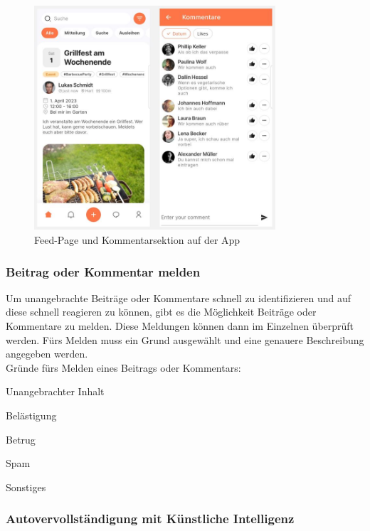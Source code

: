 \begin{figure}[H]
  \centering
  \includegraphics[width=0.8\textwidth]{pics/feed-and-comment-section.JPG}
  \caption{Feed-Page und Kommentarsektion auf der App}
  \label{fig:feed-comment}
\end{figure}


\subsubsection{Beitrag oder Kommentar melden}
Um unangebrachte Beiträge oder Kommentare schnell zu identifizieren und auf diese schnell reagieren zu können, gibt es die Möglichkeit Beiträge oder Kommentare zu melden. Diese Meldungen können dann im Einzelnen überprüft werden. Fürs Melden muss ein Grund ausgewählt und eine genauere Beschreibung angegeben werden.
\\
Gründe fürs Melden eines Beitrags oder Kommentars:

\begin{compactitem}
  \item Unangebrachter Inhalt
  \item Belästigung
  \item Betrug
  \item Spam
  \item Sonstiges
\end{compactitem}

\subsubsection{Autovervollständigung
  mit Künstliche Intelligenz}
